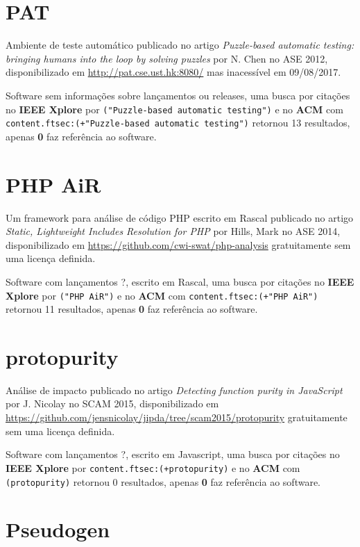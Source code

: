 \section{PAT}

Ambiente de teste automático
publicado no artigo {\it Puzzle-based automatic testing: bringing humans into the loop by solving puzzles}
por N. Chen
no ASE 2012,
disponibilizado em \url{http://pat.cse.ust.hk:8080/}
mas inacessível em 09/08/2017.

Software sem informações sobre lançamentos ou releases,
uma busca por citações no {\bf IEEE Xplore} por
\texttt{("Puzzle-based automatic testing")}
e no {\bf ACM} com
\texttt{content.ftsec:(+"Puzzle-based automatic testing")}
retornou
13 resultados, apenas
{\bf 0} faz referência ao software.



\section{PHP AiR}

Um framework para análise de código PHP escrito em Rascal
publicado no artigo {\it Static, Lightweight Includes Resolution for PHP}
por Hills, Mark
no ASE 2014,
disponibilizado em \url{https://github.com/cwi-swat/php-analysis}
gratuitamente
sem uma licença definida.

Software com lançamentos ?,
escrito em Rascal,
uma busca por citações no {\bf IEEE Xplore} por
\texttt{("PHP AiR")}
e no {\bf ACM} com
\texttt{content.ftsec:(+"PHP AiR")}
retornou
11 resultados, apenas
{\bf 0} faz referência ao software.



\section{protopurity}

Análise de impacto
publicado no artigo {\it Detecting function purity in JavaScript}
por J. Nicolay
no SCAM 2015,
disponibilizado em \url{https://github.com/jensnicolay/jipda/tree/scam2015/protopurity}
gratuitamente
sem uma licença definida.

Software com lançamentos ?,
escrito em Javascript,
uma busca por citações no {\bf IEEE Xplore} por
\texttt{content.ftsec:(+protopurity)}
e no {\bf ACM} com
\texttt{(protopurity)}
retornou
0 resultados, apenas
{\bf 0} faz referência ao software.



\section{Pseudogen}

